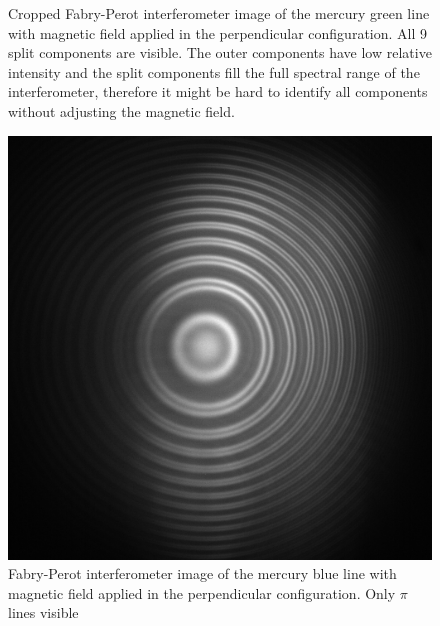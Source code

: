 \documentclass[11pt]{article}
\begin{document}
\begin{figure}[h!]
\begin{minipage}[t]{0.47\linewidth}
        \captionsetup{justification=centering}
        \caption{Cropped Fabry-Perot interferometer image of the mercury green line with magnetic field applied in the perpendicular configuration. All 9 split components are visible. The outer components have low relative intensity and the split components fill the full spectral range of the interferometer, therefore it might be hard to identify all components without adjusting the magnetic field. }
    \end{minipage}
\end{figure}
\begin{figure}[h!]
    \centering
    \begin{minipage}[t]{0.47\linewidth}
        \centering
        \includegraphics[width=\linewidth]{Hg blue pi high zeeman.png}
        \captionsetup{justification=centering}
        \caption{Fabry-Perot interferometer image of the mercury blue line with magnetic field applied in the perpendicular configuration. Only $\pi$ lines visible}
        \label{img: Hg blue pi perp}
    \end{minipage}\hfill
    \begin{minipage}[t]{0.47\linewidth}
        \centering

\end{minipage}
\end{figure}
\end{document}
